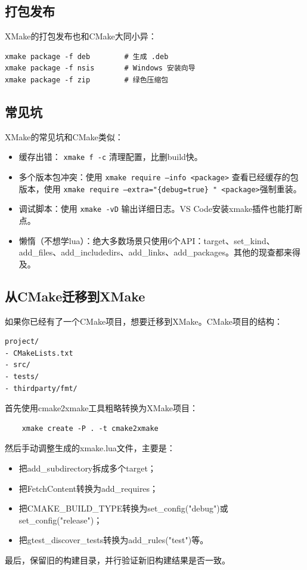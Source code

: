 \subsection{打包发布}
XMake的打包发布也和CMake大同小异：
\begin{verbatim}
xmake package -f deb        # 生成 .deb
xmake package -f nsis       # Windows 安装向导
xmake package -f zip        # 绿色压缩包
\end{verbatim}

\subsection{常见坑}
XMake的常见坑和CMake类似：
\begin{itemize}
    \item 缓存出错： \texttt{xmake f -c} 清理配置，比删build快。
    \item 多个版本包冲突：使用 \texttt{xmake require --info <package>} 查看已经缓存的包版本，使用 \texttt{xmake require --extra="\{debug=true\} " <package>}强制重装。
    \item 调试脚本：使用 \texttt{xmake -vD} 输出详细日志。VS Code安装xmake插件也能打断点。
    \item 懒惰（不想学lua）：绝大多数场景只使用6个API：target、set\_kind、add\_files、add\_includedirs、add\_links、add\_packages。其他的现查都来得及。
\end{itemize}

\subsection{从CMake迁移到XMake}
如果你已经有了一个CMake项目，想要迁移到XMake。CMake项目的结构：
\begin{verbatim}
project/
- CMakeLists.txt
- src/
- tests/
- thirdparty/fmt/
\end{verbatim}

首先使用cmake2xmake工具粗略转换为XMake项目：
\begin{verbatim}
    xmake create -P . -t cmake2xmake
\end{verbatim}
然后手动调整生成的xmake.lua文件，主要是：
\begin{itemize}
    \item 把add\_subdirectory拆成多个target；
    \item 把FetchContent转换为add\_requires；
    \item 把CMAKE\_BUILD\_TYPE转换为set\_config("debug")或set\_config("release")；
    \item 把gtest\_discover\_tests转换为add\_rules("test")等。
\end{itemize}
最后，保留旧的构建目录，并行验证新旧构建结果是否一致。

